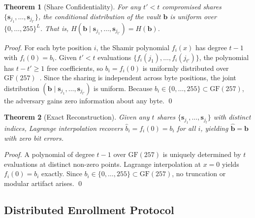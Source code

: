 \documentclass[3p,twocolumn]{elsarticle}
\newtheorem{theorem}{Theorem}
\begin{document}
\begin{theorem}[Share Confidentiality]
\label{thm:share_confidentiality}
For any $t'{<}t$ compromised shares $\{\mathbf{s}_{j_1}, \ldots, \mathbf{s}_{j_{t'}}\}$, the conditional distribution of the vault $\mathbf{b}$ is uniform over $\{0, \ldots, 255\}^L$. That is, $H(\mathbf{b} \mid \mathbf{s}_{j_1}, \ldots, \mathbf{s}_{j_{t'}}) = H(\mathbf{b})$.
\end{theorem}

\begin{proof}
For each byte position $i$, the Shamir polynomial $f_i(x)$ has degree $t{-}1$ with $f_i(0) = b_i$. Given $t' < t$ evaluations $\{f_i(j_1), \ldots, f_i(j_{t'})\}$, the polynomial has $t - t' \geq 1$ free coefficients, so $b_i = f_i(0)$ is uniformly distributed over $\mathrm{GF}(257)$~\cite{shamir1979how}. Since the sharing is independent across byte positions, the joint distribution $(\mathbf{b} \mid \mathbf{s}_{j_1}, \ldots, \mathbf{s}_{j_{t'}})$ is uniform. Because $b_i \in \{0, \ldots, 255\} \subset \mathrm{GF}(257)$, the adversary gains zero information about any byte. \qed
\end{proof}

\begin{theorem}[Exact Reconstruction]
\label{thm:exact_recon}
Given any $t$ shares $\{\mathbf{s}_{j_1}, \ldots, \mathbf{s}_{j_t}\}$ with distinct indices, Lagrange interpolation recovers $\hat{b}_i = f_i(0) = b_i$ for all $i$, yielding $\hat{\mathbf{b}} = \mathbf{b}$ with zero bit errors.
\end{theorem}

\begin{proof}
A polynomial of degree $t{-}1$ over $\mathrm{GF}(257)$ is uniquely determined by $t$ evaluations at distinct non-zero points. Lagrange interpolation at $x = 0$ yields $f_i(0) = b_i$ exactly. Since $b_i \in \{0, \ldots, 255\} \subset \mathrm{GF}(257)$, no truncation or modular artifact arises. \qed
\end{proof}

\subsection{Distributed Enrollment Protocol}
\label{sec:dist_enrollment}
\end{document}
